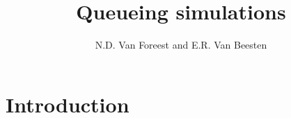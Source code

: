 \usepackage[solutionfiles]{optional}



\usepackage[english]{babel}

\usepackage{mathtools,amsthm,amssymb}
\usepackage{verbatim}
\usepackage[colorlinks=true]{hyperref}

\usepackage[T1]{fontenc}
\usepackage{fouriernc}
\usepackage{fontawesome} %
\newcommand{\hintsymbol}{\marginpar{\center{\faLinux}}}


\usepackage{pythontex}

\usepackage{fancyhdr}
\pagestyle{fancy}
\fancyhead{} %
\fancyhead[LO, LE]{\rightmark}
\fancyfoot{} %
\fancyfoot[C]{\thepage}
\setlength{\headheight}{14pt} 

\renewcommand{\Hintlabel}[1]{\textbf{h.#1}}
\renewcommand{\Solutionlabel}[1]{\textbf{s.#1}}

\theoremstyle{definition} %
\newtheorem{exercise}{Exercise}[section]

\usepackage{etoolbox}%
\AtBeginEnvironment{hint}{\hintsymbol} 

\newcommand{\E}[1]{\,\mathsf{E}\left[#1\right]}

\title{Queueing simulations}
\author{N.D. Van Foreest and E.R. Van Beesten}


\maketitle

\tableofcontents

\clearpage



\section{Introduction}

